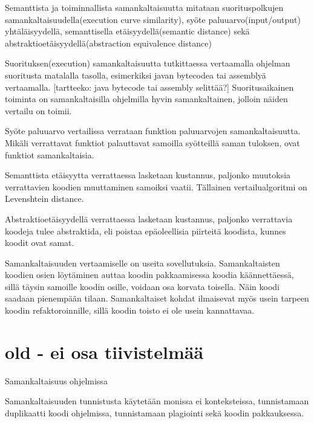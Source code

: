 \documentclass[finnish]{tktltiki2}
\theoremstyle{definition}
\theoremstyle{remark}
\begin{document}
\begin{itemize}
Semanttista ja toiminnallista samankaltaisuutta mitataan suorituspolkujen samankaltaisuudella(execution curve similarity), syöte paluuarvo(input/output) yhtäläisyydellä, semanttisella etäisyydellä(semantic distance) sekä abstraktioetäisyydellä(abstraction equivalence distance)

Suorituksen(execution) samankaltaisuutta tutkittaessa vertaamalla ohjelman suoritusta matalalla tasolla, esimerkiksi javan bytecodea tai assemblyä vertaamalla. [tartteeko: java bytecode tai assembly selittää?] Suoritusaikainen toiminta on samankaltaisilla ohjelmilla hyvin samankaltainen, jolloin näiden vertailu on toimii.

Syöte paluuarvo vertailissa verrataan funktion paluuarvojen samankaltaisuutta. Mikäli verrattavat funktiot palauttavat samoilla syötteillä saman tuloksen, ovat funktiot samankaltaisia.

Semanttista etäisyytta verrattaessa lasketaan kustannus, paljonko muutoksia verrattavien koodien muuttaminen samoiksi vaatii. Tällainen vertailualgoritmi on Levenshtein distance.

Abstraktioetäisyydellä verrattaessa lasketaan kustannus, paljonko verrattavia koodeja tulee abstraktida, eli poistaa epäoleellisia piirteitä koodista, kunnes koodit ovat samat.
\end{itemize}

Samankaltaisuuden vertaamiselle on useita sovellutuksia. Samankaltaisten koodien osien löytäminen auttaa koodin pakkaamisessa koodia käännettäessä, sillä täysin samoille koodin osille, voidaan osa korvata toisella. Näin koodi saadaan pienempään tilaan. Samankaltaiset kohdat ilmaisevat myös usein tarpeen koodin refaktoroinnille, sillä koodin toisto ei ole usein kannattavaa.















\newpage





\section{old - ei osa tiivistelmää}
Samankaltaisuus ohjelmissa

Samankaltaisuuden tunnistusta käytetään monissa ei konteksteissa, tunnistamaan duplikaatti koodi ohjelmissa, tunnistamaan plagiointi sekä koodin pakkauksessa.
\end{document}
